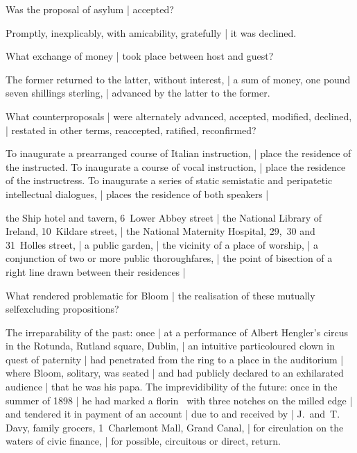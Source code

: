 
Was the proposal of asylum |
accepted?

\Factual
Promptly, inexplicably, with amicability, gratefully |
it was declined.


What exchange of money |
took place between host and guest?

\Factual
The former returned to the latter, without interest, |
a sum of money,
one pound seven shillings sterling, |
advanced by the latter to the former.



What counterproposals |
were alternately advanced, accepted, modified, declined, |
restated in other terms, reaccepted, ratified, reconfirmed?

\Places
To inaugurate a prearranged course of Italian instruction, |
place the residence of the instructed.
To inaugurate a course of vocal instruction, |
place the residence of the instructress.
To inaugurate a series of static semistatic and peripatetic intellectual dialogues, |
places the residence of both speakers |

\Poetry
the Ship hotel and tavern, 6~Lower Abbey street
 |
the National Library of Ireland, 10~Kildare street, |
the National Maternity Hospital, 29,~30 and 31~Holles street, |
a public garden, |
the vicinity of a place of worship, |
a conjunction of two or more public thoroughfares, |
the point of bisection of a right line drawn between their residences |


What rendered problematic for Bloom |
the realisation of these mutually selfexcluding propositions?

\Memories
The irreparability of the past:
once |
at a performance of Albert Hengler's circus in the Rotunda, Rutland square, Dublin, |
an intuitive particoloured clown in quest of paternity |
had penetrated from the ring to a place in the auditorium |
where Bloom, solitary, was seated |
and had publicly declared to an exhilarated audience |
that he
was his
papa.
The imprevidibility of the future:
once in the summer of 1898 |
he
had marked a florin~
with three notches on the milled edge |
and tendered it in payment of an account |
due to and received by |
J.~and~T. Davy, family grocers, 1~Charlemont Mall, Grand Canal, |
for circulation on the waters of civic finance, |
for possible, circuitous or direct, return.


